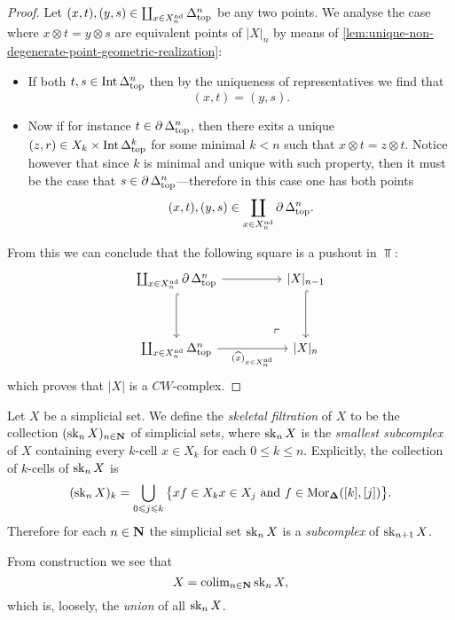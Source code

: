 \begin{proof}
    Let \((x, t), (y, s) \in \coprod_{x \in X_n^{\operatorname{nd}}} \Delta_{\text{top}}^n\) be any two
    points.  We analyse the case where \(x \otimes t = y \otimes s\) are equivalent
    points of \(|X|_n\) by means of
    \cref{lem:unique-non-degenerate-point-geometric-realization}:
    \begin{itemize}\setlength\itemsep{0em}
        \item If both \(t, s \in \operatorname{Int} \Delta_{\text{top}}^n\) then by the uniqueness of
              representatives we find that
              \[
                  (x, t) = (y, s).
              \]

        \item Now if for instance \(t \in \operatorname{\partial} \Delta_{\text{top}}^n\), then there exits a
              unique \((z, r) \in X_k \times \operatorname{Int} \Delta_{\text{top}}^k\) for some minimal \(k < n\)
              such that \(x \otimes t = z \otimes t\). Notice however that since \(k\) is
              minimal and unique with such property, then it must be the case that
              \(s \in \operatorname{\partial} \Delta_{\text{top}}^n\)---therefore in this case one has both points
              \[
                  (x, t), (y, s) \in \coprod_{x \in X_n^{\operatorname{nd}}} \operatorname{\partial} \Delta_{\text{top}}^n.
              \]
    \end{itemize}
    From this we can conclude that the following square is a pushout in \(\Top\):
    \[
        \begin{tikzcd}
            \coprod_{x \in X_n^{\Nondeg}} \Bd \splxtop^n
            \ar[dd, hook]
            \ar[rr]
            \ar[rdrd, "\ulcorner", phantom, very near end]
            &&{|X|_{n-1}} \ar[dd, hook]
            \\
            &&
            \\
            \coprod_{x \in X_n^{\Nondeg}} \splxtop^n
            \ar[rr, "(\widehat x)_{x \in X_n^{\Nondeg}}"']
            &&{|X|_n}
        \end{tikzcd}
    \]
    which proves that \(|X|\) is a \(CW\)-complex.
\end{proof}

\begin{definition}
    \label{def:skeletal-filtration-sset}
    Let \(X\) be a simplicial set. We define the \emph{skeletal filtration} of \(X\)
    to be the collection \((\operatorname{sk}_n X)_{n \in \mathbf{N}}\) of simplicial sets, where
    \(\operatorname{sk}_n X\) is the \emph{smallest subcomplex} of \(X\) containing every
    \(k\)-cell \(x \in X_k\) for each \(0 \leq k \leq n\). Explicitly, the
    collection of \(k\)-cells of \(\operatorname{sk}_n X\) is
    \[
        (\operatorname{sk}_n X)_k = \bigcup_{0 \leqslant j \leqslant k}
        \big\{ x f \in X_k
        \relax x \in X_j
        \text{ and }
        f \in \operatorname{Mor}_{{\mathbf{\Delta}}}([k], [j])\big\}.
    \]
    Therefore for each \(n \in \mathbf{N}\) the simplicial set \(\operatorname{sk}_n X\) is a
    \emph{subcomplex} of \(\operatorname{sk}_{n+1} X\).

    From construction we see that
    \[
        X = \operatorname{colim}_{n \in \mathbf{N}} \operatorname{sk}_n X,
    \]
    which is, loosely, the \emph{union} of all \(\operatorname{sk}_n X\).
\end{definition}

